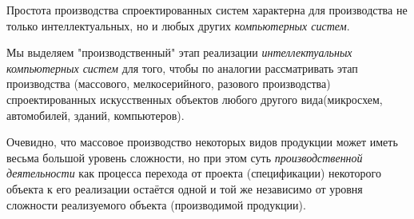 \begin{SCn}
{		Простота производства спроектированных систем характерна для производства не только интеллектуальных, но и любых других \textit{компьютерных систем}.
		
		Мы выделяем "производственный" этап реализации \textit{интеллектуальных компьютерных систем} для того, чтобы по аналогии рассматривать этап производства (массового, мелкосерийного, разового производства) спроектированных искусственных объектов любого другого вида(микросхем, автомобилей, зданий,  компьютеров).
		
		Очевидно, что массовое производство некоторых видов продукции может иметь весьма большой уровень сложности, но при этом суть \textit{производственной деятельности} как процесса перехода от проекта (спецификации) некоторого объекта к его реализации остаётся одной и той же независимо от уровня сложности  реализуемого объекта (производимой продукции).
	}	
	
	
	

\end{SCn}
